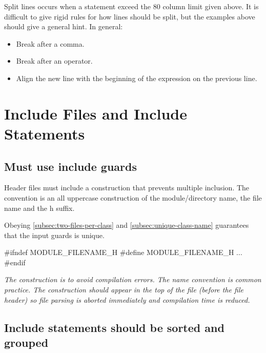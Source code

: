 \documentclass[a4paper,11pt,oneside]{scrbook}
\newcommand{\guideline}[1]{{\subsection{#1}}}
\newcommand{\motivation}[1]{{\normalfont \itshape #1}}
\newcommand{\trcode}[1]{{\normalfont \ttfamily #1}}
\begin{document}
Split lines occurs when a statement exceed the 80 column limit given above. It
is difficult to give rigid rules for how lines should be split, but the examples
above should give a general hint. In general:

\begin{itemize}
  \item
    Break after a comma.

  \item
    Break after an operator. 

  \item
    Align the new line with the beginning of the expression on the previous line. 
\end{itemize}

\section{Include Files and Include Statements}

\guideline{Must use include guards}
\label{guideline:define-guard}

Header files must include a construction that prevents multiple inclusion. The
convention is an all uppercase construction of the module/directory name, the
file name and the \trcode{h} suffix.

Obeying \ref{subsec:two-files-per-class} and \ref{subsec:unique-class-name}
guarantees that the input guards is unique.

\begin{code}
  #ifndef MODULE_FILENAME_H
  #define MODULE_FILENAME_H
  ...
  #endif 
\end{code}

\motivation{
  The construction is to avoid compilation errors. The name convention is common
  practice. The construction should appear in the top of the file (before the
  file header) so file parsing is aborted immediately and compilation time is
  reduced.
}

\guideline{Include statements should be sorted and grouped}
\end{document}
